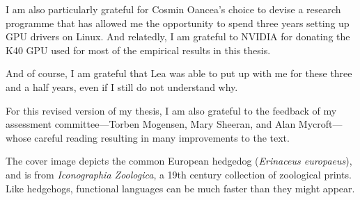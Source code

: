 I am also particularly grateful for Cosmin Oancea's choice to devise a
research programme that has allowed me the opportunity to spend three
years setting up GPU drivers on Linux.  And relatedly, I am grateful
to NVIDIA for donating the K40 GPU used for most of the empirical
results in this thesis.

And of course, I am grateful that Lea was able to put up with me for
these three and a half years, even if I still do not understand why.

For this revised version of my thesis, I am also grateful to the
feedback of my assessment committee---Torben Mogensen, Mary Sheeran,
and Alan Mycroft---whose careful reading resulting in many
improvements to the text.

The cover image depicts the common European hedgedog
(\textit{Erinaceus europaeus}), and is from \textit{Iconographia
  Zoologica}, a 19th century collection of zoological prints.  Like
hedgehogs, functional languages can be much faster than they might
appear.


